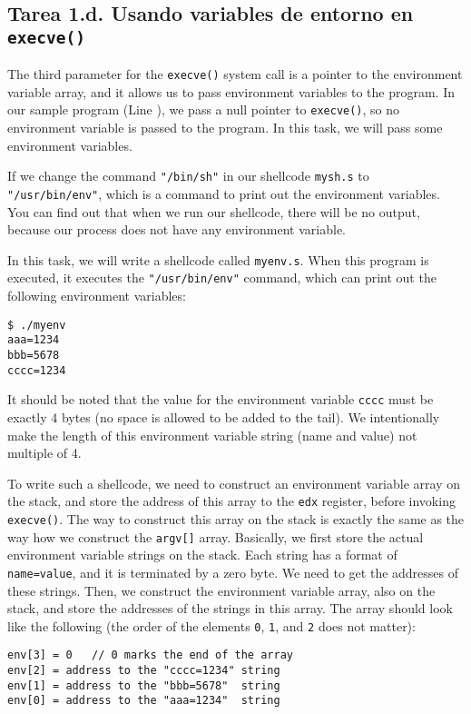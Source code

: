 \subsection{Tarea 1.d. Usando variables de entorno en \texttt{execve()}}

The third parameter for the \texttt{execve()} system call
is a pointer to the environment variable array, and it allows 
us to pass environment variables to the program. In our 
sample program (Line ), we
pass a null pointer to \texttt{execve()}, so
no environment variable is passed to the program. 
In this task, we will pass some environment variables. 

If we change the command \texttt{"/bin/sh"} in our shellcode
\texttt{mysh.s} to \texttt{"/usr/bin/env"}, which is a command to print out the 
environment variables. You can find out that when we run
our shellcode, there will be no output, because our 
process does not have any environment variable.


In this task, we will write a shellcode called \texttt{myenv.s}. When this 
program is executed, it executes the \texttt{"/usr/bin/env"} command, which
can print out the following environment variables: 

\begin{lstlisting}
$ ./myenv
aaa=1234
bbb=5678
cccc=1234
\end{lstlisting}

It should be noted that the value for the environment variable \texttt{cccc}
must be exactly 4 bytes (no space is allowed to be added to the tail).
We intentionally make the length of this environment variable string (name and value)
not multiple of 4.


To write such a shellcode, we need to construct an
environment variable array on the stack, 
and store the address of this array to the \texttt{edx} register,  
before invoking \texttt{execve()}.  
The way to construct this array on the stack is exactly the same
as the way how we construct the \texttt{argv[]} array. Basically,
we first store the actual environment variable strings on the stack.
Each string has a format of \texttt{name=value}, and it is terminated by
a zero byte. We need to get the addresses of these 
strings. Then, we construct the 
environment variable array, also on the stack, and store the 
addresses of the strings in this array.  
The array should look like the following (the order of 
the elements \texttt{0}, \texttt{1}, and \texttt{2} does not matter): 

\begin{lstlisting}
env[3] = 0   // 0 marks the end of the array
env[2] = address to the "cccc=1234" string
env[1] = address to the "bbb=5678"  string
env[0] = address to the "aaa=1234"  string
\end{lstlisting}









